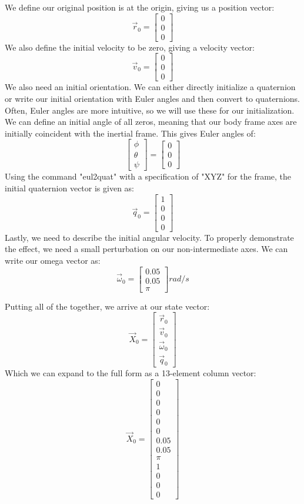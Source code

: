 \documentclass[12pt]{report}
\begin{document}
We define our original position is at the origin, giving us a position vector:
$$\vec{r}_0=\begin{bmatrix}
    0\\0\\0
\end{bmatrix}$$
We also define the initial velocity to be zero, giving a velocity vector:
$$\vec{v}_0=\begin{bmatrix}
    0\\0\\0
\end{bmatrix}$$
We also need an initial orientation. We can either directly initialize a \gls{quaternion} or write our initial orientation with \gls{Euler angles} and then convert to \glspl{quaternion}. Often, \gls{Euler angles} are more intuitive, so we will use these for our initialization. We can define an initial angle of all zeros, meaning that our body frame axes are initially coincident with the inertial frame. This gives \gls{Euler angles} of:
$$\begin{bmatrix}
    \phi\\\theta\\\psi
\end{bmatrix} =
\begin{bmatrix}
    0\\0\\0
\end{bmatrix}$$
Using the command "eul2quat" with a specification of "XYZ" for the frame, the initial \gls{quaternion} vector is given as:
$$\vec{q}_0=\begin{bmatrix}
    1\\0\\0\\0
\end{bmatrix}$$
Lastly, we need to describe the initial angular velocity. To properly demonstrate the effect, we need a small perturbation on our non-intermediate axes. We can write our omega vector as:
$$\vec{\omega}_0=\begin{bmatrix}
0.05\\0.05\\\pi
\end{bmatrix} rad/s$$

Putting all of the together, we arrive at our \gls{state vector}:
$$\vec{X}_0=\begin{bmatrix}
    \vec{r}_0\\\vec{v}_0\\\vec{\omega}_0\\\vec{q}_0
\end{bmatrix}$$
Which we can expand to the full form as a 13-element column vector:
$$\vec{X}_0=\begin{bmatrix}
    0\\0\\0\\0\\0\\0\\0.05\\0.05\\\pi\\1\\0\\0\\0
\end{bmatrix}$$
\end{document}
